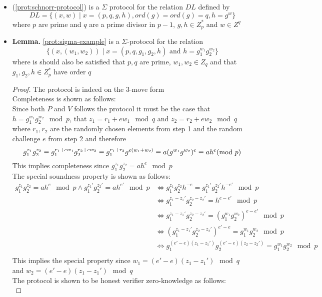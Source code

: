 \begin{itemize}
	\item {} (\autoref{prot:schnorr-protocol}) is a $\Sigma$ protocol for the relation $DL$ defined by
  \[
    DL = \{(x,w) \mid x = (p,q,g,h), ord(g) = ord(g) = q, h=g^w\}
  \]
  where $p$ are prime and $q$ are a prime divisor in $p-1$, $g,h \in Z_p^*$ and $w \in Z^q$
  \item \textbf{Lemma.} \autoref{prot:sigma-example} is a $\Sigma$-protocol for the relation
  \[
    \{(x,(w_1,w_2)) \mid x = (p,q,g_1,g_2,h) \text{ and } h = g_1^{w_1} g_2^ {w_2}\}
  \]  
  where is should also be satisfied that $p,q$ are prime, $w_1, w_2 \in Z_q$ and that $g_1, g_2, h \in Z_p^*$ have order $q$ 
  \begin{proof} 
  The protocol is indeed on the 3-move form \\
  Completeness is shown as follows: \\
  Since both $P$ and $V$ follows the protocol it must be the case that $h = g_1^{w_1} g_2^{w_2} \mod p$, that $z_1 =r_1 + ew_1 \mod q$ and $z_2 = r_2 + ew_2 \mod q$ where $r_1,r_2$ are the randomly chosen elements from step 1 and the random challenge $e$ from step 2 and therefore
  \[
    g_1^{z_1}g_2^{z_2} \equiv g_1^{r_1 + ew_1}g_2^{r_2 + ew_2} \equiv g_1^{r_1 + r_2} g^{e(w_1 + w_2)} \equiv a (g^{w_1}g^{w_2})^e \equiv ah^e (\text{mod } p)
  \]
  This implies completeness since $g_1^{z_1}g_2^{z_2} = ah^e \mod p$ \smallskip \\
  The special soundness property is shown as follows:
  \begin{align*}  
    g_1^{z_1}g_2^{z_2} = ah^e \mod p \land g_1^{z_1'}g_2^{z_2'} = ah^{e'} \mod p &\iff
    g_1^{z_1}g_2^{z_2}h^{-e} = g_1^{z_1'}g_2^{z_2'}h^{-e'} \mod p \\
    &\iff g_1^{z_1-z_1'}g_2^{z_2-z_2'} = h^{e-e'} \mod p \\
    &\iff g_1^{z_1-z_1'}g_2^{z_2-z_2'} = (g_1^{w_1}g_2^{w_2})^{e-e'} \mod p \\
    &\iff (g_1^{z_1-z_1'}g_2^{z_2-z_2'})^{e'-e} = g_1^{w_1}g_2^{w_2} \mod p \\
    &\iff g_1^{(e'-e)(z_1-z_1')}g_2^{(e'-e)(z_2-z_2')} = g_1^{w_1}g_2^{w_2} \mod p \\
  \end{align*}
  This implies the special property since $w_1 = (e'-e)(z_1 - z_1') \mod q$ and $w_2 = (e'-e)(z_1 - z_1') \mod q$ \smallskip \\
  The protocol is shown to be honest verifier zero-knowledge as follows: \\

\end{proof}
\end{itemize}
